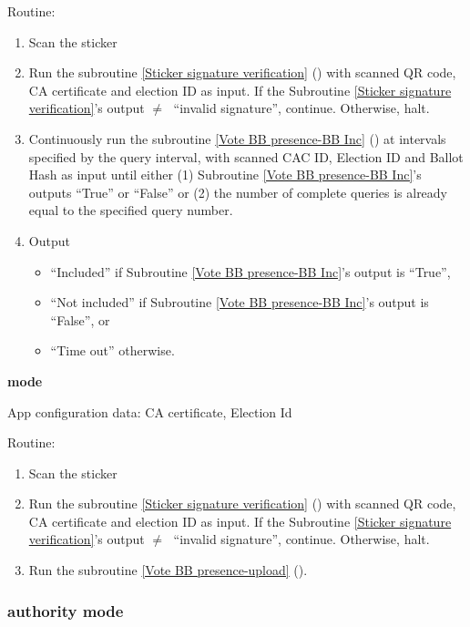\documentclass{article}
\begin{document}
Routine:
\begin{enumerate}
    \item Scan the sticker
    \item Run the subroutine \ref{Sticker signature verification} (\StickersignatureVerification{}) with scanned QR code, CA certificate and election ID as input. If the Subroutine \ref{Sticker signature verification}'s output $\neq\;$ ``invalid signature'', continue. Otherwise, halt.
    \item Continuously run the subroutine \ref{Vote BB presence-BB Inc} (\BBInclusionCheck{}) at intervals specified by the query interval, with scanned CAC ID, Election ID and Ballot Hash as input until either (1) Subroutine \ref{Vote BB presence-BB Inc}'s outputs ``True'' or ``False'' or (2) the number of complete queries is already equal to the specified query number. 
    \item Output 
    \begin{itemize}
        \item ``Included'' if Subroutine \ref{Vote BB presence-BB Inc}'s output is ``True'',
        \item ``Not included'' if Subroutine \ref{Vote BB presence-BB Inc}'s output is ``False'', or
        \item ``Time out'' otherwise.
    \end{itemize}
    
\end{enumerate}

\textbf{\StickerBBUpload{}{} mode}

App configuration data: CA certificate, Election Id


Routine:
\begin{enumerate}
    \item Scan the sticker
    \item Run the subroutine \ref{Sticker signature verification} (\StickersignatureVerification{}) with scanned QR code, CA certificate and election ID as input. If the Subroutine \ref{Sticker signature verification}'s output $\neq\;$ ``invalid signature'', continue. Otherwise, halt.
    \item Run the subroutine \ref{Vote BB presence-upload} (\StickerBBUpload{}).
\end{enumerate}

\subsubsection{\remoteVotingCenter{} authority mode}
\end{document}
